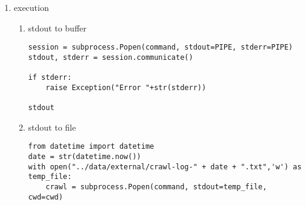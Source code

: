 \documentclass[11pt]{article}
\begin{document}
\begin{enumerate}
\begin{enumerate}
\begin{enumerate}
\item execution
\label{sec:org2a16f03}
\begin{enumerate}
\item stdout to buffer
\label{sec:org203a985}
\begin{verbatim}
session = subprocess.Popen(command, stdout=PIPE, stderr=PIPE)
stdout, stderr = session.communicate()

if stderr:
    raise Exception("Error "+str(stderr))

stdout
\end{verbatim}

\item stdout to file
\label{sec:org34fcdd3}
\begin{verbatim}
from datetime import datetime
date = str(datetime.now())
with open("../data/external/crawl-log-" + date + ".txt",'w') as temp_file:
    crawl = subprocess.Popen(command, stdout=temp_file, cwd=cwd)
\end{verbatim}
\end{enumerate}
\end{enumerate}
\end{enumerate}
\end{enumerate}
\end{document}
